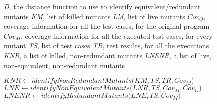 
\renewcommand{\INDA}{5}
\renewcommand{\INDB}{10}
\renewcommand{\INDC}{15}
\newcommand{\INDD}{20}
\newcommand{\INDE}{25}

\renewcommand{\Comment}[1]{\textcolor{darkgray}{\textit{//#1}}}

\begin{figure}[tb]

\begin{algorithmic}[1]

\scriptsize
\Require \emph{D}, the distance function to use to identify equivalent/redundant mutants
\Require \emph{KM}, list of killed mutants
\Require \emph{LM}, list of live mutants
\Require $\mathit{Cov}_O$, coverage information for all the test cases, for the original program
\Require $\mathit{Cov}_M$, coverage information for all the executed test cases, for every mutant
\Require \emph{TS}, list of test cases
\Require \emph{TR}, test results, for all the executions
\Ensure \emph{KNR}, a list of killed, non-redundant  mutants
\Ensure \emph{LNENR}, a list of live, non-equivalent, non-redundant mutants

\State $\mathit{KNR} \gets \mathit{identifyNonRedundantMutants(} \mathit{KM}, \mathit{TS}, \mathit{TR}, \mathit{Cov}_M)$ \label{alg:equivalent:KNR}
\State $\mathit{LNE} \gets \mathit{identifyNonEquivalentMutants(} \mathit{LNR}, \mathit{TS}, \mathit{Cov}_M, \mathit{Cov}_O)$ \label{alg:equivalent:LNE}
\State $\mathit{LNENR} \gets \mathit{identifyRedundantMutants(} \mathit{LNE}, \mathit{TS}, \mathit{Cov}_M)$ \label{alg:equivalent:LNENR}



\end{algorithmic}
\end{figure}
